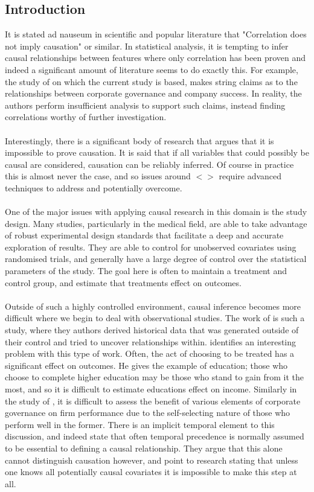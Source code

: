 \subsection{Introduction}
{It is stated ad nauseum in scientific and popular literature that "Correlation does not imply causation" or similar. In statistical analysis, it is tempting to infer causal relationships between features where only correlation has been proven and indeed a significant amount of literature seems to do exactly this. For example, the study of \cite{moldovan2015learning} on which the current study is based, makes string claims as to the relationships between corporate governance and company success. In reality, the authors perform insufficient analysis to support such claims, instead finding correlations worthy of further investigation. \\\\
Interestingly, there is a significant body of research that argues that it is impossible to prove causation. It is said that if all variables that could possibly be causal are considered, causation can be reliably inferred. Of course in practice this is almost never the case, and so issues around $<>$ require advanced techniques to address and potentially overcome.     \\\\
One of the major issues with applying causal research in this domain is the study design. Many studies, particularly in the medical field, are able to take advantage of robust experimental design standards that facilitate a deep and accurate exploration of results. They are able to control for unobserved covariates using randomised trials, and generally have a large degree of control over the statistical parameters of the study. The goal here is often to maintain a treatment and control group, and estimate that treatments effect on outcomes.  \\\\
Outside of such a highly controlled environment, causal inference becomes more difficult where we begin to deal with observational studies. The work of \cite{moldovan2015learning} is such a study, where they authors derived historical data that was generated outside of their control and tried to uncover relationships within. \cite{esarey2015causal} identifies an interesting problem with this type of work. Often, the act of choosing to be treated has a significant effect on outcomes. He gives the example of education; those who choose to complete higher education may be those who stand to gain from it the most, and so it is difficult to estimate educations effect on income. Similarly in the study of \cite{moldovan2015learning}, it is difficult to assess the benefit of various elements of corporate governance on firm performance due to the self-selecting nature of those who perform well in the former. There is an implicit temporal element to this discussion, and indeed \cite{pearl1995theory} state that often temporal precedence is normally assumed to be essential to defining a causal relationship. They argue that this alone cannot distinguish causation however, and point to research stating that unless one knows all potentially causal covariates it is impossible to make this step at all. \\\\
}
